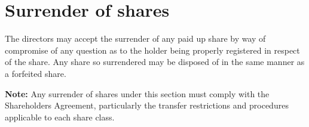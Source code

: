 \section{Surrender of shares}

The directors may accept the surrender of any paid up share by way of compromise of any question as to the holder being properly registered in respect of the share. Any share so surrendered may be disposed of in the same manner as a forfeited share.

\textbf{Note:} Any surrender of shares under this section must comply with the Shareholders Agreement, particularly the transfer restrictions and procedures applicable to each share class. 